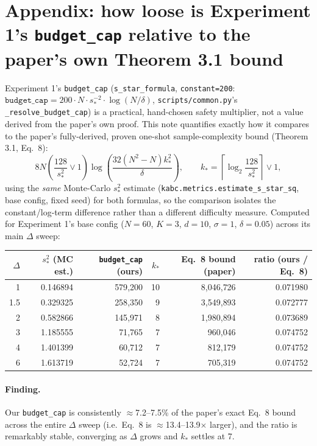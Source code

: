 \documentclass[11pt]{article}
\begin{document}
\section{Appendix: how loose is Experiment 1's \texttt{budget\_cap} relative to the paper's own Theorem 3.1 bound}
\label{sec:appendix-exp1-budgetcap-vs-eq8}

Experiment 1's \texttt{budget\_cap} (\texttt{s\_star\_formula},
\texttt{constant=200}: $\texttt{budget\_cap} = 200 \cdot N \cdot s_*^{-2}
\cdot \log(N/\delta)$, \texttt{scripts/common.py}'s
\texttt{\_resolve\_budget\_cap}) is a practical, hand-chosen safety
multiplier, not a value derived from the paper's own proof. This note
quantifies exactly how it compares to the paper's fully-derived, proven
one-shot sample-complexity bound (Theorem 3.1, Eq.~8):
$$8N\left(\frac{128}{s_*^2}\vee 1\right)\log\!\left(\frac{32(N^2-N)k_*^2}{\delta}\right),
\qquad k_* = \left\lceil \log_2\!\frac{128}{s_*^2}\right\rceil \vee 1,$$
using the \emph{same} Monte-Carlo $s_*^2$ estimate
(\texttt{kabc.metrics.estimate\_s\_star\_sq}, base config, fixed seed) for
both formulas, so the comparison isolates the constant/log-term
difference rather than a different difficulty measure. Computed for
Experiment 1's base config ($N{=}60$, $K{=}3$, $d{=}10$, $\sigma{=}1$,
$\delta{=}0.05$) across its main $\Delta$ sweep:

\begin{center}
\begin{tabular}{rrrrrr}
\toprule
$\Delta$ & $s_*^2$ (MC est.) & \texttt{budget\_cap} (ours) & $k_*$ & Eq.~8 bound (paper) & ratio (ours / Eq.~8) \\
\midrule
1   & 0.146894 & 579{,}200 & 10 & 8{,}046{,}726 & 0.071980 \\
1.5 & 0.329325 & 258{,}350 & 9  & 3{,}549{,}893 & 0.072777 \\
2   & 0.582866 & 145{,}971 & 8  & 1{,}980{,}894 & 0.073689 \\
3   & 1.185555 & 71{,}765  & 7  & 960{,}046     & 0.074752 \\
4   & 1.401399 & 60{,}712  & 7  & 812{,}179     & 0.074752 \\
6   & 1.613719 & 52{,}724  & 7  & 705{,}319     & 0.074752 \\
\bottomrule
\end{tabular}
\end{center}

\paragraph{Finding.} Our \texttt{budget\_cap} is consistently
$\approx$7.2--7.5\% of the paper's exact Eq.~8 bound across the entire
$\Delta$ sweep (i.e.\ Eq.~8 is $\approx$13.4--13.9$\times$ larger), and the
ratio is remarkably stable, converging as $\Delta$ grows and $k_*$
settles at 7.
\end{document}
